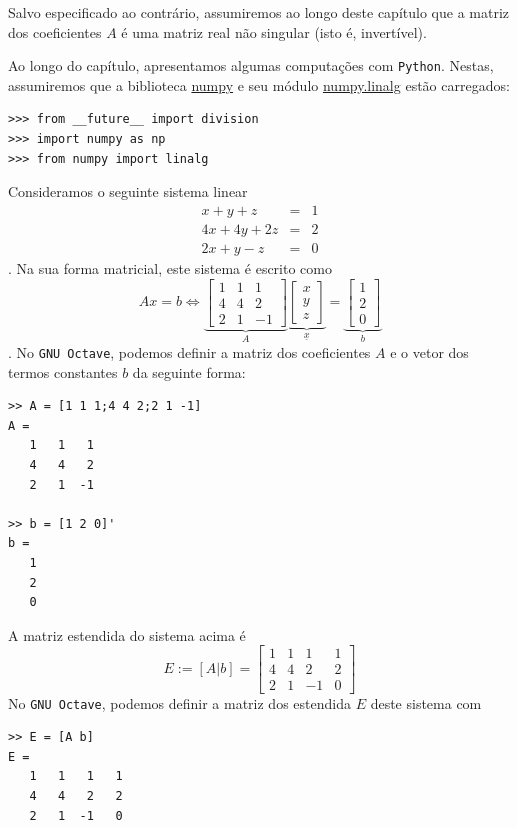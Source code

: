 Salvo especificado ao contrário, assumiremos ao longo deste capítulo que a matriz dos coeficientes $A$ é uma matriz real não singular (isto é, invertível).

\ifispython
Ao longo do capítulo, apresentamos algumas computações com \verb+Python+. Nestas, assumiremos que a biblioteca \href{http://www.numpy.org/}{numpy} e seu módulo \href{https://docs.scipy.org/doc/numpy/reference/routines.linalg.html}{numpy.linalg} estão carregados:
\begin{verbatim}
>>> from __future__ import division
>>> import numpy as np
>>> from numpy import linalg
\end{verbatim}
\fi

\begin{ex}
  Consideramos o seguinte sistema linear
  \begin{eqnarray*}
    x+y+z  &=& 1\\
    4x+4y+2z&=& 2\\
    2x+y-z &=& 0
  \end{eqnarray*}.
Na sua forma matricial, este sistema é escrito como
\begin{equation*}
  Ax = b \Leftrightarrow
  \underbrace{\begin{bmatrix}
    1 & 1 & 1\\
    4 & 4 & 2\\
    2 & 1 & -1
  \end{bmatrix}}_{A}
\underbrace{
  \begin{bmatrix}
    x\\y\\z
  \end{bmatrix}
}_{\underline{x}} =
\underbrace{
  \begin{bmatrix}
    1\\2\\0
  \end{bmatrix}}_{b}
\end{equation*}.
\ifisoctave
No \verb+GNU Octave+, podemos definir a matriz dos coeficientes $A$ e o vetor dos termos constantes $b$ da seguinte forma:
\begin{verbatim}
>> A = [1 1 1;4 4 2;2 1 -1]
A =
   1   1   1
   4   4   2
   2   1  -1

>> b = [1 2 0]'
b =
   1
   2
   0
\end{verbatim}
\fi

A matriz estendida do sistema acima é
\begin{equation*}
  E := [A|b] =
  \begin{bmatrix}
    1 & 1 & 1 & 1\\
    4 & 4 & 2 & 2\\
    2 & 1 & -1 & 0
  \end{bmatrix}
\end{equation*}
\ifisoctave
No \verb+GNU Octave+, podemos definir a matriz dos estendida $E$ deste sistema com
\begin{verbatim}
>> E = [A b]
E =
   1   1   1   1
   4   4   2   2
   2   1  -1   0
\end{verbatim}
\fi
\end{ex}

